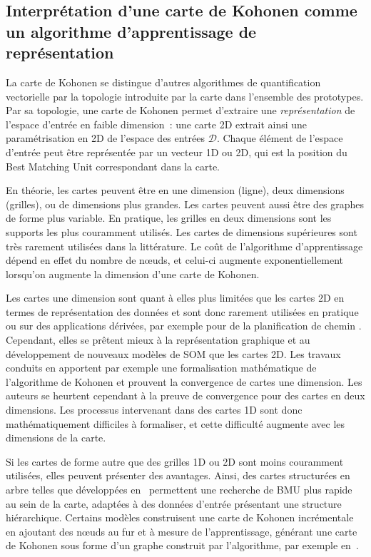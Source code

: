 \documentclass[../main]{subfiles}
\begin{document}
\subsection{Interprétation d'une carte de Kohonen comme un algorithme d'apprentissage de représentation}

La carte de Kohonen se distingue d'autres algorithmes de quantification vectorielle par la topologie introduite par la carte dans l'ensemble des prototypes.
Par sa topologie, une carte de Kohonen permet d'extraire une \emph{représentation} de l'espace d'entrée en faible dimension~: une carte 2D extrait ainsi une paramétrisation en 2D de l'espace des entrées $\mathcal{D}$.
Chaque élément de l'espace d'entrée peut être représentée par un vecteur 1D ou 2D, qui est la position du Best Matching Unit correspondant dans la carte.

En théorie, les cartes peuvent être en une dimension (ligne), deux dimensions (grilles), ou de dimensions plus grandes. Les cartes peuvent aussi être des graphes de forme plus variable. 
En pratique, les grilles en deux dimensions sont les supports les plus couramment utilisés. Les cartes de dimensions supérieures sont très rarement utilisées dans la littérature. 
Le coût de l'algorithme d'apprentissage dépend en effet du nombre de n\oe{}uds, et celui-ci augmente exponentiellement lorsqu'on augmente la dimension d'une carte de Kohonen.

Les cartes une dimension sont quant à elles plus limitées que les cartes 2D en termes de représentation des données et sont donc rarement utilisées en pratique ou sur des applications dérivées, par exemple pour de la planification de chemin \parencite{FrezzaBuet2020SelforganizingMI}.
Cependant, elles se prêtent mieux à la représentation graphique et au développement de nouveaux modèles de SOM que les cartes 2D.
Les travaux conduits en \cite{Cottrell1998TheoreticalAO,fort_soms_2006} apportent par exemple une formalisation mathématique de l'algorithme de Kohonen et prouvent la convergence de cartes une dimension. Les auteurs se heurtent cependant à la preuve de convergence pour des cartes en deux dimensions. 
Les processus intervenant dans des cartes 1D sont donc mathématiquement difficiles à formaliser, et cette difficulté augmente avec les dimensions de la carte.

Si les cartes de forme autre que des grilles 1D ou 2D sont moins couramment utilisées, elles peuvent présenter des avantages. Ainsi, des cartes structurées en arbre telles que développées en~\cite{koikkalainen_self-organizing_1990} permettent une recherche de BMU plus rapide au sein de la carte, adaptées à des données d'entrée présentant une structure hiérarchique. Certains modèles construisent une carte de Kohonen incrémentale en ajoutant des n\oe{}uds au fur et à mesure de l'apprentissage, générant une carte de Kohonen sous forme d'un graphe construit par l'algorithme, par exemple en~\cite{Fritzke1995GrowingG, alahakoon_dynamic_2000, yamaguchi_adaptive_2010}.
\end{document}
